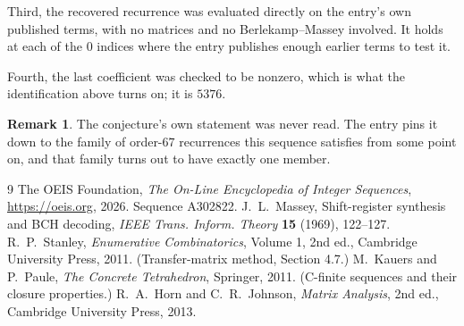 \documentclass[11pt,a4paper]{article}
\theoremstyle{plain}
\theoremstyle{definition}
\newtheorem{remark}[theorem]{Remark}
\begin{document}
Third, the recovered recurrence was evaluated directly on the entry's own published terms, with
no matrices and no Berlekamp--Massey involved. It holds at each of the $0$ indices where
the entry publishes enough earlier terms to test it.

Fourth, the last coefficient was checked to be nonzero, which is what the identification above
turns on; it is $5376$.

\begin{remark}
The conjecture's own statement was never read. The entry pins it down to the family of
order-$67$ recurrences this sequence satisfies from some point on, and that family turns
out to have exactly one member.
\end{remark}

\begin{thebibliography}{9}
 The OEIS Foundation, \emph{The On-Line Encyclopedia of Integer
Sequences}, \url{https://oeis.org}, 2026. Sequence A302822.
 J.~L.~Massey, Shift-register synthesis and BCH decoding, \emph{IEEE
Trans. Inform. Theory} \textbf{15} (1969), 122--127.
 R.~P.~Stanley, \emph{Enumerative Combinatorics}, Volume 1, 2nd ed.,
Cambridge University Press, 2011. (Transfer-matrix method, Section 4.7.)
 M.~Kauers and P.~Paule, \emph{The Concrete Tetrahedron}, Springer, 2011.
(C-finite sequences and their closure properties.)
 R.~A.~Horn and C.~R.~Johnson, \emph{Matrix Analysis}, 2nd ed., Cambridge
University Press, 2013.
\end{thebibliography}
\end{document}
